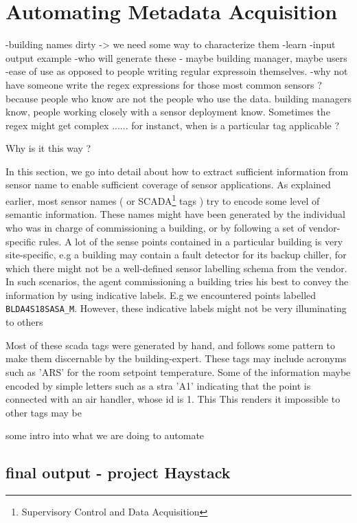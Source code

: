 \section{Automating Metadata Acquisition}

-building names dirty -> we need some way to characterize them
-learn
-input output example
-who will generate these - maybe building manager, maybe users
-ease of use as opposed to people writing regular expressoin themselves.
-why not have someone write the regex expressions for those most common sensors ? because people who know are not the people who use the data. building managers know, people working closely with a sensor deployment know. Sometimes the regex might get complex ...... for instanct, when is a particular tag applicable ? 

Why is it this way ?

In this section, we go into detail about how to extract sufficient information from sensor name to enable sufficient coverage of sensor applications. As explained earlier, most sensor names ( or SCADA\footnote{Supervisory Control and Data Acquisition} tags ) try to encode some level of semantic information. These names might have been generated by the individual who was in charge of commissioning a building, or by following a set of vendor-specific rules. A lot of the sense points contained in a particular building is very site-specific, e.g a building may contain a fault detector for its backup chiller, for which there might not be a well-defined sensor labelling schema from the vendor. In such scenarios, the agent commissioning a building tries his best to convey the information by using indicative labels. E.g we encountered points labelled \texttt{BLDA4S18SASA\_M}. However, these indicative labels might not be very illuminating to others

Most of these scada tags were generated by hand, and follows some pattern to make them discernable by the building-expert. These tags may include acronyms such as 'ARS' for the room setpoint temperature. Some of the information maybe encoded by simple letters such as a stra 'A1' indicating that the point is connected with an air handler, whose id is 1. This This renders it impossible to other tags may be 

some intro into what we are doing to automate



\subsection{final output - project Haystack}

